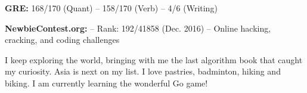 \documentclass[a4paper, 12pt]{article}
\newcommand{\marginmisc}{0.15cm}
\begin{document}
\begin{footnotesize}
\vspace{\marginmisc}
\textbf{GRE:} 168/170 (Quant) -- 158/170 (Verb) -- 4/6 (Writing)

\vspace{\marginmisc}
\textbf{NewbieContest.org:} -- Rank: 192/41858 (Dec. 2016) -- Online hacking, cracking, and coding challenges

\vspace{\marginmisc}
I keep exploring the world, bringing with me the last algorithm book that caught my curiosity. Asia is next on my list. I love pastries, badminton, hiking and biking. I am currently learning the wonderful Go game!
  
\end{footnotesize}
\end{document}
